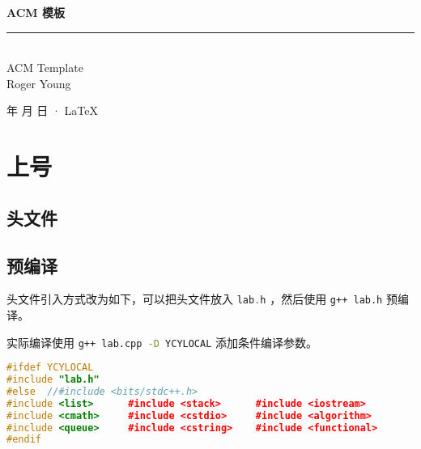 \documentclass[cn,11pt,black,normal,founder]{elegantbook}
\begin{document}
\newcommand\mfrac[2]{\dfrac{#1\smash[b]{\strut}}{#2\smash[t]{\strut}}}
\newcommand\ee{\mathrm{e}}
\newcommand\dd{\mathrm{d}}
\newcommand\uppi{\mathrm{\pi}}

\begin{titlepage}
	\vspace*{35ex}%
	\begin{minipage}{.9\textwidth}
	\flushright
		{\textbf{ACM 模板}}\\%
		\rule{\linewidth}{1pt}\\ \vspace{2ex}
		{\textsf{ACM Template}} \\%
		\vspace{30ex}%
		{Roger Young}%
	\end{minipage}
	\vfill\centering
	{\number\year 年 \number\month 月 \number\day 日 · \LaTeX{}}
\end{titlepage}
\clearpage{\hypersetup{hidelinks}\tableofcontents}

\clearpage

\chapter{上号}

\section{头文件}



\section{预编译}

头文件引入方式改为如下，可以把头文件放入 \lstinline[language=C++]{lab.h} ，然后使用 \lstinline[language=bash]{g++ lab.h} 预编译。

实际编译使用 \lstinline[language=bash]{g++ lab.cpp -D YCYLOCAL} 添加条件编译参数。

\begin{lstlisting}[language=C++]
#ifdef YCYLOCAL
#include "lab.h"
#else  //#include <bits/stdc++.h>
#include <list>      #include <stack>      #include <iostream>
#include <cmath>     #include <cstdio>     #include <algorithm>
#include <queue>     #include <cstring>    #include <functional>
#endif
\end{lstlisting}
\end{document}
